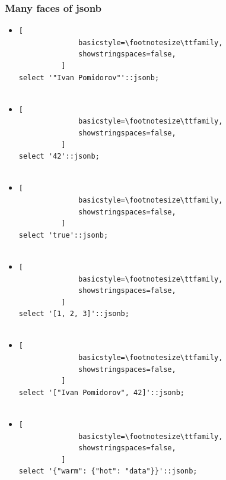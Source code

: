 \documentclass[14pt, compress]{beamer}
\begin{document}
\begin{frame}[fragile]
    \frametitle{Many faces of jsonb}

  \begin{itemize}
      \item<+->
          \begin{lstlisting}[
              basicstyle=\footnotesize\ttfamily,
              showstringspaces=false,
          ]
select '"Ivan Pomidorov"'::jsonb;
         
          \end{lstlisting}

      \item<+->
          \begin{lstlisting}[
              basicstyle=\footnotesize\ttfamily,
              showstringspaces=false,
          ]
select '42'::jsonb;
         
          \end{lstlisting}

      \item<+->
          \begin{lstlisting}[
              basicstyle=\footnotesize\ttfamily,
              showstringspaces=false,
          ]
select 'true'::jsonb;
         
          \end{lstlisting}

      \item<+->
          \begin{lstlisting}[
              basicstyle=\footnotesize\ttfamily,
              showstringspaces=false,
          ]
select '[1, 2, 3]'::jsonb;
         
          \end{lstlisting}

      \item<+->
          \begin{lstlisting}[
              basicstyle=\footnotesize\ttfamily,
              showstringspaces=false,
          ]
select '["Ivan Pomidorov", 42]'::jsonb;
         
          \end{lstlisting}

      \item<+->
          \begin{lstlisting}[
              basicstyle=\footnotesize\ttfamily,
              showstringspaces=false,
          ]
select '{"warm": {"hot": "data"}}'::jsonb;
         
          \end{lstlisting}

  \end{itemize}

\end{frame}
\end{document}
